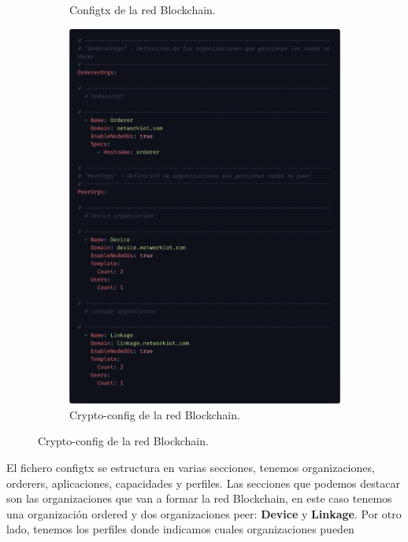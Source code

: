 \begin{figure}[h!]
\begin{subfigure}{0.5\textwidth}
    \caption{Configtx de la red Blockchain.}
    \label{fig:configtx-blockchain}
  \end{subfigure}
  \begin{subfigure}{0.5\textwidth}
    \includegraphics[width=\linewidth]{imagenes/desarrollo/crypto-config}
    \caption{Crypto-config de la red Blockchain.}
    \label{fig:crypto-config-blockchain}
  \end{subfigure}
\end{figure}

\vspace{5mm}

\noindent El fichero configtx se estructura en varias secciones, tenemos organizaciones, orderers,  aplicaciones, capacidades
y perfiles. Las secciones que podemos destacar son las organizaciones que van a formar la red Blockchain, en este caso tenemos
una organización ordered y dos organizaciones peer: \textbf{Device} y \textbf{Linkage}. Por otro lado, tenemos los perfiles donde
indicamos cuales organizaciones pueden 

